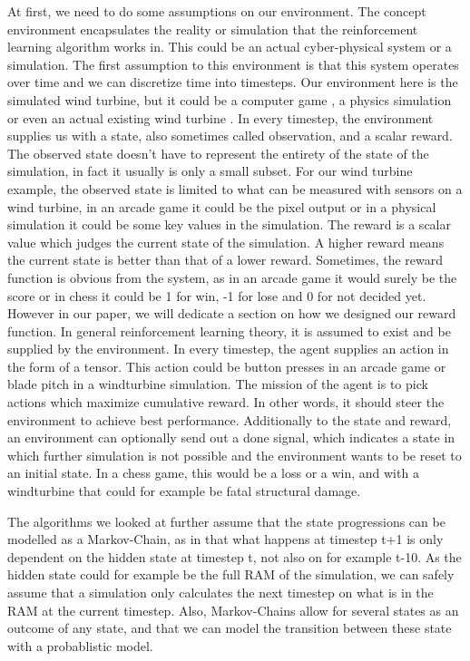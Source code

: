 \documentclass[hyperref,german,beleg]{cgvpub}
\begin{document}
At first, we need to do some assumptions on our environment. The concept environment encapsulates the reality or simulation that the reinforcement learning algorithm works in. This could be an actual cyber-physical system or a simulation. The first assumption to this environment is that this system operates over time and we can discretize time into timesteps. Our environment here is the simulated wind turbine, but it could be a computer game \cite{lillicrapCONTINUOUSCONTROLDEEP2015}, a physics simulation\cite{brockmanOpenAIGym2016} or even an actual existing wind turbine \cite{kolterDesignAnalysisLearning2012}. 
In every timestep, the environment supplies us with a state, also sometimes called observation, and a scalar reward. The observed state doesn't have to represent the entirety of the state of the simulation, in fact it usually is only a small subset. For our wind turbine example, the observed state is limited to what can be measured with sensors on a wind turbine, in an arcade game it could be the pixel output or in a physical simulation it could be some key values in the simulation. 
The reward is a scalar value which judges the current state of the simulation. A higher reward means the current state is better than that of a lower reward. Sometimes, the reward function is obvious from the system, as in an arcade game it would surely be the score or in chess it could be 1 for win, -1 for lose and 0 for not decided yet. However in our paper, we will dedicate a section on how we designed our reward function. In general reinforcement learning theory, it is assumed to exist and be supplied by the environment.
In every timestep, the agent supplies an action in the form of a tensor. This action could be button presses in an arcade game or blade pitch in a windturbine simulation. The mission of the agent is to pick actions which maximize cumulative reward. In other words, it should steer the environment to achieve best performance.
Additionally to the state and reward, an environment can optionally send out a done signal, which indicates a state in which further simulation is not possible and the environment wants to be reset to an initial state. In a chess game, this would be a loss or a win, and with a windturbine that could for example be fatal structural damage.

The algorithms we looked at further assume that the state progressions can be modelled as a Markov-Chain, as in that what happens at timestep t+1 is only dependent on the hidden state at timestep t, not also on for example t-10. As the hidden state could for example be the full RAM of the simulation, we can safely assume that a simulation only calculates the next timestep on what is in the RAM at the current timestep. Also, Markov-Chains allow for several states as an outcome of any state, and that we can model the transition between these state with a probablistic model.
\end{document}
